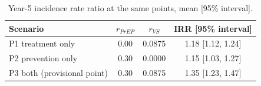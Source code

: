 \begin{table}[htbp]\centering\small
\begin{tabular}{lccc}\toprule
Scenario & $r_{PrEP}$ & $r_{VS}$ & IRR [95\% interval]\\\midrule
P1 treatment only & 0.00 & 0.0875 & 1.18 [1.12, 1.24]\\
P2 prevention only & 0.30 & 0.0000 & 1.15 [1.03, 1.27]\\
P3 both (provisional point) & 0.30 & 0.0875 & 1.35 [1.23, 1.47]\\
\bottomrule\end{tabular}\caption{Year-5 incidence rate ratio at the same points, mean [95\% interval].}\label{tab:year5}\end{table}
